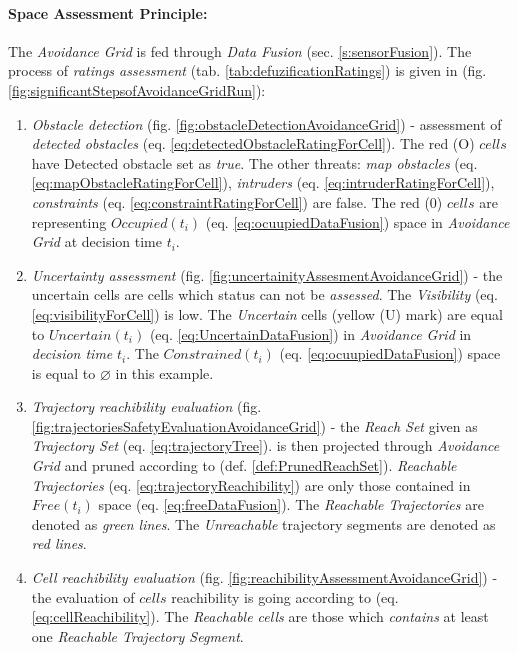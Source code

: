 \paragraph{Space Assessment Principle:} The \emph{Avoidance Grid} is fed through \emph{Data Fusion} (sec. \ref{s:sensorFusion}). The process of \emph{ratings assessment} (tab. \ref{tab:defuzificationRatings}) is given in (fig. \ref{fig:significantStepsofAvoidanceGridRun}):
\begin{enumerate}
    \item \emph{Obstacle detection} (fig. \ref{fig:obstacleDetectionAvoidanceGrid}) - assessment of \emph{detected obstacles} (eq. \ref{eq:detectedObstacleRatingForCell}). The red (O) $cells$ have Detected obstacle set as \emph{true}. The other threats: \emph{map obstacles} (eq. \ref{eq:mapObstacleRatingForCell}), \emph{intruders} (eq. \ref{eq:intruderRatingForCell}), \emph{constraints} (eq. \ref{eq:constraintRatingForCell}) are false. The red (0) $cells$ are representing $Occupied(t_i)$ (eq. \ref{eq:ocuupiedDataFusion}) space in \emph{Avoidance Grid} at decision time $t_i$.
    
    \item \emph{Uncertainty assessment} (fig. \ref{fig:uncertainityAssesmentAvoidanceGrid}) - the uncertain cells are cells which status can not be \emph{assessed}. The \emph{Visibility} (eq. \ref{eq:visibilityForCell}) is low. The \emph{Uncertain} cells (yellow (U) mark) are equal to $Uncertain(t_i)$ (eq. \ref{eq:UncertainDataFusion}) in \emph{Avoidance Grid} in \emph{decision time} $t_i$. The $Constrained(t_i)$ (eq. \ref{eq:ocuupiedDataFusion}) space is equal to $\varnothing$ in this example.
    
    \item \emph{Trajectory reachibility evaluation} (fig. \ref{fig:trajectoriesSafetyEvaluationAvoidanceGrid}) - the \emph{Reach Set} given as \emph{Trajectory Set} (eq. \ref{eq:trajectoryTree}). is then projected through \emph{Avoidance Grid} and pruned according to (def. \ref{def:PrunedReachSet}). \emph{Reachable Trajectories} (eq. \ref{eq:trajectoryReachibility}) are only those contained in $Free(t_i)$ space (eq. \ref{eq:freeDataFusion}). The \emph{Reachable Trajectories} are denoted as \emph{green lines}. The \emph{Unreachable} trajectory segments are denoted as \emph{red lines}. 
    
    \item \emph{Cell reachibility evaluation} (fig. \ref{fig:reachibilityAssessmentAvoidanceGrid}) - the evaluation of $cells$ reachibility is going according to (eq. \ref{eq:cellReachibility}). The \emph{Reachable cells} are those which \emph{contains} at least one \emph{Reachable Trajectory Segment}.
\end{enumerate}



